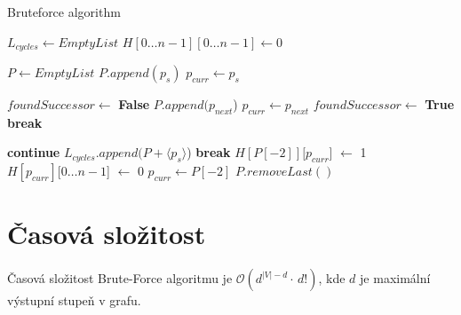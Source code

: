         \begin{algorithm}[!h]
            \DontPrintSemicolon
            \caption{Bruteforce algorithm}
            $L_{cycles} \leftarrow  \mathit{EmptyList}$\;
            $H[0 \dots n-1][0 \dots n-1] \leftarrow 0$ 
            {
                $P \leftarrow  \mathit{EmptyList}$\;
                $P.append(p_s)$\;
                $p_{curr} \leftarrow p_s$\;
                {
                    $foundSuccessor \leftarrow$ \textbf{False}\;
                    {
                        {
                        $P.append(p_{next}$)\;
                        $p_{curr} \leftarrow p_{next}$\;
                        $foundSuccessor \leftarrow$ \textbf{True}\;
                        \textbf{break}\;
                        }
                    }

                    {
                        \textbf{continue}\;
                    }
                    {
                        {
                            $L_{cycles}.append(P + \langle p_s \rangle$)\;
                        }
                        {
                            \textbf{break}\;
                        }
                        $H[P[-2]][p_{curr}$] $\leftarrow$ 1\;
                        $H[p_{curr}][0\dots n-1$] $\leftarrow$ 0\;
                        $p_{curr} \leftarrow P[-2]$\;
                        $P.removeLast()$
                    }
                }
            }
            \;
        \end{algorithm}

    \section{Časová složitost}
        \begin{theorem}
            Časová složitost Brute-Force algoritmu je $\mathcal{O}(d^{|V|-d} \cdot\, d!)$, kde $d$ je maximální výstupní stupeň v grafu.
        \end{theorem}

